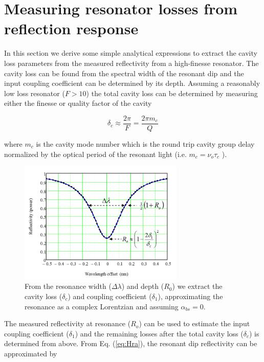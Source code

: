 \documentclass[10pt]{article}
\begin{document}
\section{Measuring resonator losses from reflection response}

In this section we derive some simple analytical expressions to extract the cavity loss parameters from the measured reflectivity from a high-finesse resonator.   The cavity loss can be found from the spectral width of the resonant dip and the input coupling coefficient can be determined by its depth.   Assuming a reasonably low loss resonator ($F>10$) the  total cavity loss can be determined by measuring either the finesse or quality factor of the cavity 


\begin{equation} 
\delta_c \approx \frac{2\pi}{F} = \frac{2 \pi m_c}{Q}
\end{equation}

\noindent  where $m_c$ is the cavity mode number which is the round trip cavity group delay normalized by the optical period of the resonant light (i.e.  $m_c = \nu_o \tau_c$ ).




\begin{figure}[htbp]
\centering\includegraphics[width=0.7\textwidth]{figures/dip}
\caption{From the resonance width ($ \Delta \lambda $) and depth ($ R_0 $) we extract the cavity loss ($ \delta_c $) and coupling coefficient ($ \delta_1 $), approximating the resonance as a complex Lorentzian and assuming $\alpha_{bs} = 0$.}
\label{fig:dip}
\end{figure}



The measured  reflectivity at resonance ($R_o$)   can be used to estimate the input coupling coefficient ($\delta_1$) and the remaining losses  after the total cavity loss ($\delta_c$) is determined from above.
From Eq. (\ref{eq:Hra}), the resonant dip reflectivity can be approximated by
\end{document}
